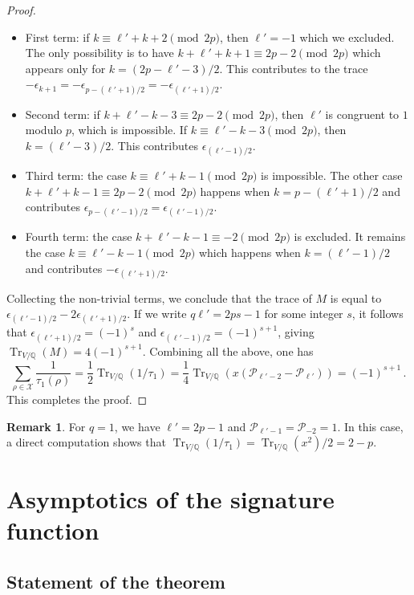 \documentclass{amsart}
\newcommand{\Q}{\mathbb{Q}}
\newcommand{\calX}{\mathcal{X}}
\DeclareMathOperator{\Tr}{Tr}
\def\calP{\mathcal{P}}
\theoremstyle{definition}
\newtheorem{Remark}[Theorem]{Remark}
\begin{document}
\begin{proof}
    \begin{itemize}[leftmargin=*]
    \item First term: if $k \equiv \ell'+k+2 \pmod{2p}$, then $\ell'=-1$ which we excluded. The only possibility is to have $k+\ell'+k+1 \equiv 2p-2 \pmod{2p}$ which appears only for $k=(2p-\ell'-3)/2$. This contributes to the trace $-\epsilon_{k+1}=-\epsilon_{p-(\ell'+1)/2}=-\epsilon_{(\ell'+1)/2}$.
    \item Second term: if $k+\ell'-k-3\equiv 2p-2 \pmod{2p}$, then $\ell'$ is congruent to $1$ modulo $p$, which is impossible. If $k \equiv \ell'-k-3 \pmod{2p}$, then $k=(\ell'-3)/2$. This contributes $\epsilon_{(\ell'-1)/2}$.
    \item Third term: the case $k \equiv \ell'+k-1 \pmod{2p}$ is impossible. The other case  $k+\ell'+k-1\equiv 2p-2 \pmod{2p}$ happens when $k=p-(\ell'+1)/2$ and contributes $\epsilon_{p-(\ell'-1)/2}=\epsilon_{(\ell'-1)/2}$.
    \item  Fourth term: the case $k+\ell'-k-1 \equiv -2 \pmod{2p}$ is excluded. It remains the case $k \equiv \ell'-k-1 \pmod{2p}$ which happens when $k=(\ell'-1)/2$ and contributes $-\epsilon_{(\ell'+1)/2}$. 
    \end{itemize}
    Collecting the non-trivial terms, we conclude that the trace of $M$ is equal to $\epsilon_{(\ell'-1)/2}-2\epsilon_{(\ell'+1)/2}$. If we write $q\ell'=2ps-1$ for some integer $s$, it follows that $\epsilon_{(\ell'+1)/2}=(-1)^s$ and $\epsilon_{(\ell'-1)/2}=(-1)^{s+1}$, giving $\Tr_{V/\Q}(M)=4(-1)^{s+1}$. Combining all the above, one has
    \begin{equation*}
        \sum_{\rho \in \calX} \frac{1}{\tau_1(\rho)} = \frac{1}{2} \Tr_{V/\Q}(1/\tau_1) =
        \frac{1}{4}\Tr_{V/\Q}(x(\calP_{\ell'-2}-\calP_{\ell'})) = (-1)^{s+1} \,.
    \end{equation*} 
    This completes the proof.
\end{proof}

\begin{Remark}
For $q=1$, we have $\ell'=2p-1$ and $\calP_{\ell'-1}=\calP_{-2}=1$. In this case, a direct computation shows that $\Tr_{V/\Q}(1/\tau_1)=\Tr_{V/\Q}(x^2)/2=2-p$.
\end{Remark}


\section{Asymptotics of the signature function}\label{section:asympto}

\subsection{Statement of the theorem}
\end{document}
